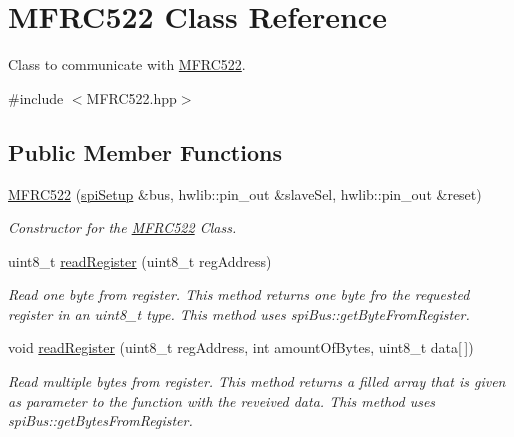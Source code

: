 \hypertarget{classMFRC522}{}\section{M\+F\+R\+C522 Class Reference}
\label{classMFRC522}


Class to communicate with \hyperlink{classMFRC522}{M\+F\+R\+C522}.  




{\ttfamily \#include $<$M\+F\+R\+C522.\+hpp$>$}

\subsection*{Public Member Functions}
\begin{DoxyCompactItemize}
\item 
\hyperlink{classMFRC522_a941f62373024077506c43cc67e73f6ae}{M\+F\+R\+C522} (\hyperlink{classspiSetup}{spi\+Setup} \&bus, hwlib\+::pin\+\_\+out \&slave\+Sel, hwlib\+::pin\+\_\+out \&reset)
\begin{DoxyCompactList}\small\item\em Constructor for the \hyperlink{classMFRC522}{M\+F\+R\+C522} Class. \end{DoxyCompactList}\item 
\mbox{\label{classMFRC522_acf84c1c99926ebeffb31480c12492b31}} 
uint8\+\_\+t \hyperlink{classMFRC522_acf84c1c99926ebeffb31480c12492b31}{read\+Register} (uint8\+\_\+t reg\+Address)
\begin{DoxyCompactList}\small\item\em Read one byte from register.  This method returns one byte fro the requested register in an uint8\+\_\+t type. This method uses spi\+Bus\+::get\+Byte\+From\+Register. \end{DoxyCompactList}\item 
\mbox{\label{classMFRC522_a8c8646d903f327c46f544f65e873f2eb}} 
void \hyperlink{classMFRC522_a8c8646d903f327c46f544f65e873f2eb}{read\+Register} (uint8\+\_\+t reg\+Address, int amount\+Of\+Bytes, uint8\+\_\+t data\mbox{[}$\,$\mbox{]})
\begin{DoxyCompactList}\small\item\em Read multiple bytes from register.  This method returns a filled array that is given as parameter to the function with the reveived data. This method uses spi\+Bus\+::get\+Bytes\+From\+Register. \end{DoxyCompactList}\item 

\end{DoxyCompactItemize}
